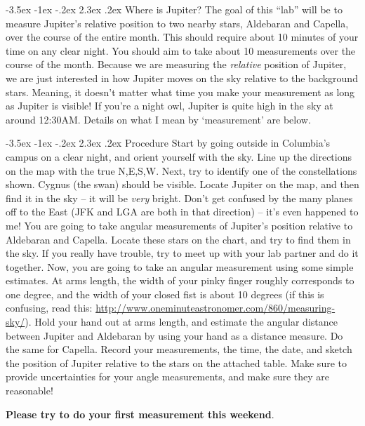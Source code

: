\documentclass[12pt]{article}
\makeatletter
\renewcommand\section{\@startsection{section}{1}{\z@}%
                                  {-3.5ex \@plus -1ex \@minus -.2ex}%
                                  {2.3ex \@plus.2ex}%
                                  {\normalfont\large\bfseries}}
\makeatother
\begin{document}
\section{Where is Jupiter?}
The goal of this ``lab'' will be to measure Jupiter's relative position to two nearby stars, Aldebaran and Capella, over the course of the entire month. This should require about 10 minutes of your time on any clear night. You should aim to take about 10 measurements over the course of the month. Because we are measuring the \emph{relative} position of Jupiter, we are just interested in how Jupiter moves on the sky relative to the background stars. Meaning, it doesn't matter what time you make your measurement as long as Jupiter is visible! If you're a night owl, Jupiter is quite high in the sky at around 12:30AM. Details on what I mean by `measurement' are below.

\section{Procedure}
Start by going outside in Columbia's campus on a clear night, and orient yourself with the sky. Line up the directions on the map with the true N,E,S,W. Next, try to identify one of the constellations shown. Cygnus (the swan) should be visible. Locate Jupiter on the map, and then find it in the sky -- it will be \textit{very} bright. Don't get confused by the many planes off to the East (JFK and LGA are both in that direction) -- it's even happened to me! You are going to take angular measurements of Jupiter's position relative to Aldebaran and Capella. Locate these stars on the chart, and try to find them in the sky. If you really have trouble, try to meet up with your lab partner and do it together. Now, you are going to take an angular measurement using some simple estimates. At arms length, the width of your pinky finger roughly corresponds to one degree, and the width of your closed fist is about 10 degrees (if this is confusing, read this: \url{http://www.oneminuteastronomer.com/860/measuring-sky/}). Hold your hand out at arms length, and estimate the angular distance between Jupiter and Aldebaran by using your hand as a distance measure. Do the same for Capella. Record your measurements, the time, the date, and sketch the position of Jupiter relative to the stars on the attached table. Make sure to provide uncertainties for your angle measurements, and make sure they are reasonable!

\textbf{Please try to do your first measurement this weekend}.
\end{document}
